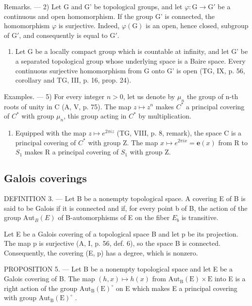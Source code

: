 Remarks. --- 2) Let G and G' be topological groups, and let \(\varphi\colon\mathrm{G}\to\mathrm{G}'\) be a continuous and open homomorphism. If the group G' is connected, the homomorphism \(\varphi\) is surjective. Indeed, \(\varphi(\mathrm{G})\) is an open, hence closed, subgroup of \(\mathrm{G}'\), and consequently is equal to \(\mathrm{G}'\).

\begin{enumerate}
\def\labelenumi{\arabic{enumi})}
\setcounter{enumi}{2}
\tightlist
\item
  Let G be a locally compact group which is countable at infinity, and let G' be a separated topological group whose underlying space is a Baire space. Every continuous surjective homomorphism from G onto G' is open (TG, IX, p. 56, corollary and TG, III, p. 16, prop. 24).
\end{enumerate}

Examples. --- 5) For every integer \(n > 0\), let us denote by \(\mu_{n}\) the group of n-th roots of unity in C (A, V, p. 75). The map \(z \mapsto z^{n}\) makes \(C^{*}\) a principal covering of \(C^{*}\) with group \(\mu_{n}\), this group acting in \(C^{*}\) by multiplication.

\begin{enumerate}
\def\labelenumi{\arabic{enumi})}
\setcounter{enumi}{5}
\tightlist
\item
  Equipped with the map \(z \mapsto e^{2\pi iz}\) (TG, VIII, p. 8, remark), the space C is a principal covering of \(C^{*}\) with group Z. The map \(x \mapsto e^{2\pi ix} = \mathbf{e}(x)\) from R to \(S_{1}\) makes R a principal covering of \(S_{1}\) with group Z.
\end{enumerate}

\subsection{Galois coverings}

DEFINITION 3. --- Let B be a nonempty topological space. A covering E of B is said to be Galois if it is connected and if, for every point b of B, the action of the group \(\mathrm{Aut}_{B}(E)\) of B-automorphisms of E on the fiber \(E_{b}\) is transitive.

Let E be a Galois covering of a topological space B and let p be its projection. The map p is surjective (A, I, p. 56, def. 6), so the space B is connected. Consequently, the covering (E, p) has a degree, which is nonzero.

PROPOSITION 5. --- Let B be a nonempty topological space and let E be a Galois covering of B. The map \((h,x)\mapsto h(x)\) from \(\mathrm{Aut}_{\mathrm{B}}(\mathrm{E})\times\mathrm{E}\) into E is a right action of the group \(\mathrm{Aut}_{\mathrm{B}}(\mathrm{E})^{\circ}\) on E which makes E a principal covering with group \(\mathrm{Aut}_{\mathrm{B}}(\mathrm{E})^{\circ}\) .

